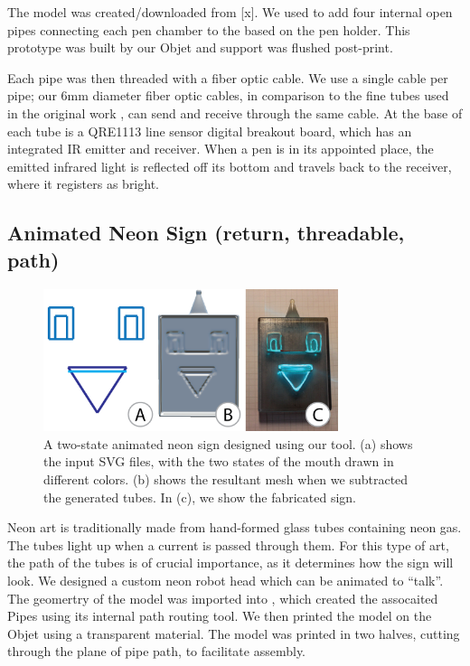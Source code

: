 The model was created/downloaded from [x]. We used \systemnamenospace to add four internal open pipes connecting each pen chamber to the based on the pen holder. This prototype was built by our Objet and support was flushed post-print. 

Each pipe was then threaded with a fiber optic cable.  We use a single cable per pipe; our 6mm diameter fiber optic cables, in comparison to the fine tubes used in the original work , can send and receive through the same cable.   At the base of each tube is a QRE1113 line sensor digital breakout board, which has an integrated IR emitter and receiver.   When a pen is in its appointed place, the emitted infrared light is reflected off its bottom and travels back to the receiver, where it registers as bright.  

\subsection{Animated Neon Sign (return, threadable, path)}

\begin{figure}[h!]
\centering
    \includegraphics[width=3.4in]{figures/sign.png}
\caption{A two-state animated neon sign designed using our tool.  (a) shows the input SVG files, with the two states of the mouth drawn in different colors.   (b) shows the resultant mesh when we subtracted the generated tubes.  In (c), we show the fabricated sign.}
\label{fig:neon}
\end{figure}

Neon art is traditionally made from hand-formed glass tubes containing neon gas.  The tubes light up when a current is passed through them.  For this type of art, the path of the tubes is of crucial importance, as it determines how the sign will look.  We designed a custom neon robot head which can be animated to ``talk''.  
The geomertry of the model was imported into \systemnamenospace, which created the assocaited Pipes using its internal path routing tool. We then printed the model on the Objet using a transparent material. The model was printed in two halves, cutting through the plane of pipe path, to facilitate assembly. 

